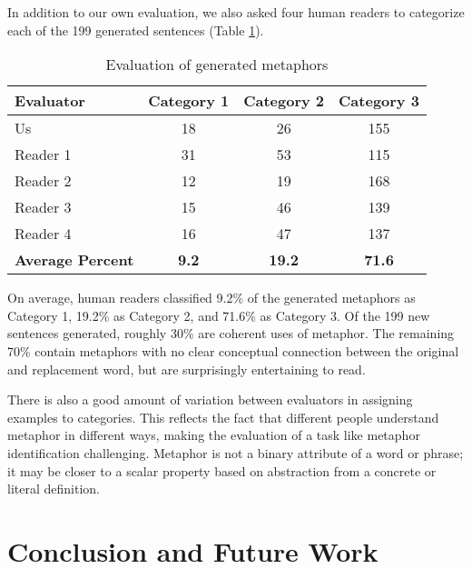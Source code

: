 \documentclass[12pt]{article}
\begin{document}
In addition to our own evaluation, we also asked four human readers to categorize each of the 199 generated sentences (Table \ref{tab:catresults}).

\begin{table}[H]
    \centering
    \small
    \begin{tabular}{|l|c|c|c|} \hline
    \textbf{Evaluator} & \textbf{Category 1} & \textbf{Category 2} & \textbf{Category 3} \\ \hline
    Us & 18 & 26 & 155\\ \hline
    Reader 1 & 31 & 53 & 115\\ \hline
    Reader 2 & 12 & 19 & 168\\ \hline
    Reader 3 & 15 & 46 & 139\\ \hline
    Reader 4 & 16 & 47 & 137\\ \hline
    \textbf{Average Percent} & \textbf{9.2} & \textbf{19.2} & \textbf{71.6} \\ \hline
    \end{tabular}
    \caption{Evaluation of generated metaphors}
    \label{tab:catresults}
\end{table}

On average, human readers classified 9.2\% of the generated metaphors as Category 1, 19.2\% as Category 2, and 71.6\% as Category 3. Of the 199 new sentences generated, roughly 30\% are coherent uses of metaphor. The remaining 70\% contain metaphors with no clear conceptual connection between the original and replacement word, but are surprisingly entertaining to read.

There is also a good amount of variation between evaluators in assigning examples to categories. This reflects the fact that different people understand metaphor in different ways, making the evaluation of a task like metaphor identification challenging. Metaphor is not a binary attribute of a word or phrase; it may be closer to a scalar property based on abstraction from a concrete or literal definition.

\section{Conclusion and Future Work}
\end{document}
